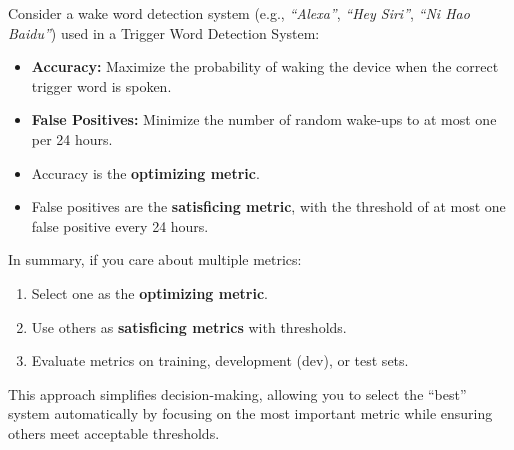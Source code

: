 \documentclass[letterpaper,12pt,notitlepage,twoside]{report}
\begin{document}
Consider a wake word detection system (e.g., \textit{“Alexa”}, \textit{“Hey Siri”}, \textit{“Ni Hao Baidu”}) used in a Trigger Word Detection System:
\begin{itemize}[noitemsep, topsep=0pt]
    \item \textbf{Accuracy:} Maximize the probability of waking the device when the correct trigger word is spoken.
    \item \textbf{False Positives:} Minimize the number of random wake-ups to at most one per 24 hours.
    \item Accuracy is the \textbf{optimizing metric}.
    \item False positives are the \textbf{satisficing metric}, with the threshold of at most one false positive every 24 hours.
\end{itemize}

In summary, if you care about multiple metrics:
\begin{enumerate}[noitemsep, topsep=0pt]
    \item Select one as the \textbf{optimizing metric}.
    \item Use others as \textbf{satisficing metrics} with thresholds.
    \item Evaluate metrics on training, development (dev), or test sets.
\end{enumerate}

This approach simplifies decision-making, allowing you to select the ``best'' system automatically by focusing on the most important metric while ensuring others meet acceptable thresholds.

\end{document}
